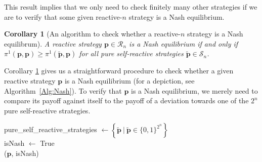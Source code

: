 \documentclass[9pt,twoside,lineno]{pnas-new}
\theoremstyle{plainCl1}
\newtheorem{corollary}{Corollary}
\theoremstyle{plainCl2}
\begin{document}
\noindent
This result implies that we only need to check finitely many other strategies if we are to verify that some given reactive-$n$ strategy is a Nash equilibrium. 

\begin{corollary}[An algorithm to check whether a reactive-$n$ strategy is a Nash equilibrum]
\label{Cor:NashCondition}
A reactive strategy $\mathbf{p}\!\in\!\mathcal{R}_n$ is a Nash equilibrium if and only if $\pi^1(\mathbf{p},\mathbf{p}) \!\ge\! \pi^1(\mathbf{\tilde p},\mathbf{p})$ for all pure self-reactive strategies $\mathbf{\tilde p}\!\in\!\mathcal{S}_n$. 
\end{corollary}

\noindent
Corollary \ref{Cor:NashCondition} gives us a straightforward procedure to check
whether a given reactive strategy $\mathbf{p}$ is a Nash equilibrium (for a
depiction, see Algorithm~\ref{Alg:Nash}). To verify that $\mathbf{p}$ is a Nash
equilibrium, we merely need to compare its payoff against itself to the payoff
of a deviation towards one of the $2^n$ pure self-reactive strategies.\\

\begin{algorithm}[t!]
      pure\_self\_reactive\_strategies $\gets \left\{ \mathbf{\tilde{p}} ~\big|~ \mathbf{\tilde{p}} \in \{0, 1\}^{2 ^ n} \right\}$ \\
      isNash $\gets$ True \\
      \Return (\(\mathbf{p}\), isNash) \;
  \caption{An algorithm to verify whether a given reactive strategy~$\mathbf{p}$ is a Nash equilibrium.}
  \label{Alg:Nash}
\end{algorithm}


\end{document}

